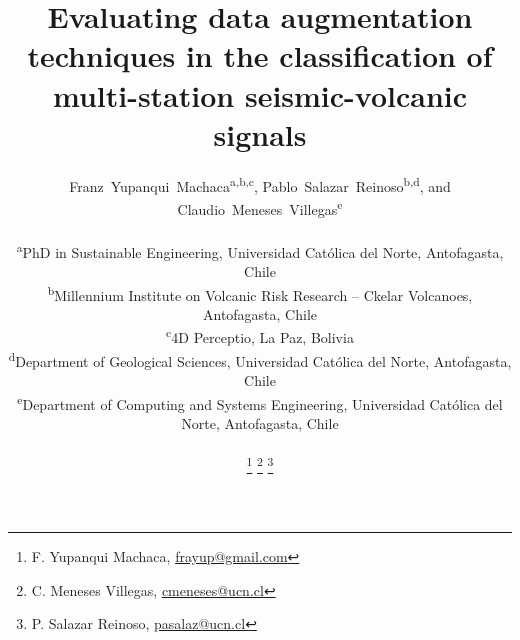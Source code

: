 \documentclass[journal]{IEEEtran}
\begin{document}
%
\title{Evaluating data augmentation techniques in the classification of multi-station seismic-volcanic signals}
%
%
%

\author{Franz~Yupanqui~Machaca\textsuperscript{a,b,c}, Pablo~Salazar~Reinoso\textsuperscript{b,d}, and
  Claudio~Meneses~Villegas\textsuperscript{e}\\
  \vspace{1mm}
  \begin{flushleft}
  \small\textsuperscript{a}PhD in Sustainable Engineering, Universidad Católica del Norte, Antofagasta, Chile\\
  \textsuperscript{b}Millennium Institute on Volcanic Risk Research – Ckelar Volcanoes, Antofagasta, Chile\\
  \textsuperscript{c}4D Perceptio, La Paz, Bolivia\\
  \textsuperscript{d}Department of Geological Sciences, Universidad Católica del Norte, Antofagasta, Chile\\
  \textsuperscript{e}Department of Computing and Systems Engineering, Universidad Católica del Norte, Antofagasta, Chile\\
  \end{flushleft}
  \thanks{F. Yupanqui Machaca, \color{blue}\href{mailto:frayup@gmail.com}{frayup@gmail.com} }
  \thanks{C. Meneses Villegas, \color{blue}\href{mailto:cmeneses@ucn.cl}{cmeneses@ucn.cl} }
  \thanks{P. Salazar Reinoso, \color{blue}\href{mailto:pasalaz@ucn.cl}{pasalaz@ucn.cl} }
}
\end{document}
